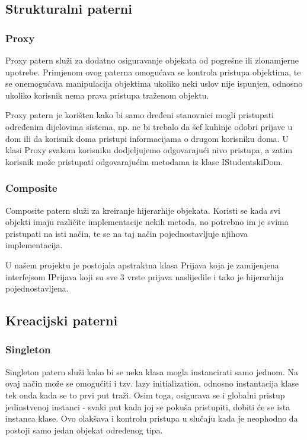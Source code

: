 \documentclass{article}
\begin{document}
\subsection{Strukturalni paterni}

\subsubsection*{Proxy}
\hspace{\indent}Proxy patern služi za dodatno osiguravanje objekata od pogrešne ili zlonamjerne upotrebe. Primjenom ovog paterna omogućava se kontrola pristupa objektima, te se onemogućava manipulacija objektima ukoliko neki uslov nije ispunjen, odnosno ukoliko korisnik nema prava pristupa traženom objektu.

Proxy patern je korišten kako bi samo dređeni stanovnici mogli pristupati određenim dijelovima sistema, np. ne bi trebalo da šef kuhinje odobri prijave u dom ili da korisnik doma pristupi informacijama o drugom korisniku doma. U klasi Proxy svakom korisniku dodjeljujemo odgovarajući nivo pristupa, a zatim korisnik može pristupati odgovarajućim metodama iz klase IStudentskiDom.


\subsubsection*{Composite}
\hspace{\indent}Composite patern služi za kreiranje hijerarhije objekata. Koristi se kada svi objekti imaju različite implementacije nekih metoda, no potrebno im je svima pristupati na isti način, te se na taj način pojednostavljuje njihova implementacija.

U našem projektu je postojala apstraktna klasa Prijava koja je zamijenjena interfejsom IPrijava koji su sve 3 vrste prijava naslijedile i tako je hijerarhija pojednostavljena.

\subsection{Kreacijski paterni}

\subsubsection*{Singleton}

\hspace{\indent}Singleton patern služi kako bi se neka klasa mogla instancirati samo jednom. Na ovaj način može se omogućiti i tzv. lazy initialization, odnosno instantacija klase tek onda kada se to prvi
put traži. Osim toga, osigurava se i globalni pristup jedinstvenoj instanci - svaki put kada joj
se pokuša pristupiti, dobiti će se ista instanca klase. Ovo olakšava i kontrolu pristupa u slučaju
kada je neophodno da postoji samo jedan objekat određenog tipa.
\end{document}
